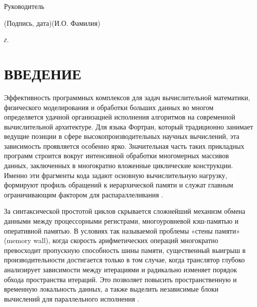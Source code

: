 \documentclass[14pt, russian]{scrartcl}
\newcommand{\anonsection}[1]{\cleardoublepage
\phantomsection
\addcontentsline{toc}{section}{\protect\numberline{}#1}
\section*{#1}\vspace*{2.5ex} %
}
\begin{document}
\begin{titlepage}
\bigskip

\noindent Руководитель  \hfill \underline{\hspace{4cm}}\quad
\underline{\hspace{4cm}}

\vspace{-2ex}
\noindent\hspace{13.5ex}\normalsize\hspace{170pt}\hspace{2ex}\scriptsize{(Подпись, дата)}\normalsize\hspace{30pt}\hspace{6ex}\scriptsize{(И.О. Фамилия)}\normalsize
\vfill

\begin{center}
\textsl{\the\year{} г.}
\end{center}
\end{titlepage}

\setlength{\tabcolsep}{3pt}
\newpage
\setcounter{page}{2}

\renewcommand\contentsname{\hfill{\normalfont{СОДЕРЖАНИЕ}}\hfill}
\setcounter{tocdepth}{3}
\tableofcontents
\newpage
\anonsection{ВВЕДЕНИЕ}

Эффективность программных комплексов для задач вычислительной математики, физического моделирования и обработки больших данных во многом определяется удачной организацией исполнения алгоритмов на современной вычислительной архитектуре. Для языка Фортран, который традиционно занимает ведущие позиции в сфере высокопроизводительных научных вычислений, эта зависимость проявляется особенно ярко. Значительная часть таких прикладных программ строится вокруг интенсивной обработки многомерных массивов данных, заключенных в многократно вложенные циклические конструкции. Именно эти фрагменты кода задают основную вычислительную нагрузку, формируют профиль обращений к иерархической памяти и служат главным ограничивающим фактором для распараллеливания \cite{aho2007dragon}.

За синтаксической простотой циклов скрывается сложнейший механизм обмена данными между процессорными регистрами, многоуровневой кэш-памятью и оперативной памятью. В условиях так называемой проблемы «стены памяти» (memory wall), когда скорость арифметических операций многократно превосходит пропускную способность шины памяти, существенный выигрыш в производительности достигается только в том случае, когда транслятор глубоко анализирует зависимости между итерациями и радикально изменяет порядок обхода пространства итераций. Это позволяет повысить пространственную и временную локальность данных, а также выделить независимые блоки вычислений для параллельного исполнения \cite{muchnick1997}.
\end{document}
